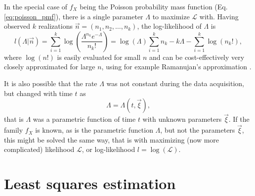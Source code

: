 In the special case of $f_X$ being the Poisson probability mass function (Eq. \ref{eq:poisson_pmf}), there is a single parameter $\Lambda$ to maximize $\mathcal{L}$ with. Having observed $k$ realizations $\vec{n} = (n_1, n_2, \dots , n_k)$, the log-likelihood of $\Lambda$ is
\begin{equation}
    l(\Lambda|\vec{n}) = \sum_{i=1}^k \log \left( \frac{\Lambda^{n_k} e^{-\Lambda}}{n_k!} \right) = \log(\Lambda) \sum_{i=1}^k n_k - k \Lambda - \sum_{i=1}^k \log(n_k!),  
\end{equation}
where $\log(n!)$ is easily evaluated for small $n$ and can be cost-effectively very closely approximated for large $n$, using for example Ramanujan's approximation \citep{ramanujan1988lost}. 

It is also possible that the rate $\Lambda$ was not constant during the data acquisition, but changed with time $t$ as
\begin{equation}
    \Lambda = \Lambda(t,\vec{\xi}), \label{eq:compound_model}
\end{equation}
that is $\Lambda$ was a parametric function of time $t$ with unknown parameters $\vec{\xi}$. If the family $f_X$ is known, as is the parametric function $\Lambda$, but not the parameters $\vec{\xi}$, this might be solved the same way, that is with maximizing (now more complicated) likelihood $\mathcal{L}$, or log-likelihood $l = \log(\mathcal{L})$. 

\section{Least squares estimation}

